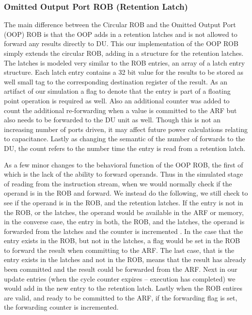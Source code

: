 \subsubsection{Omitted Output Port ROB (Retention Latch)}
The main difference between the Circular ROB and the Omitted Output Port (OOP) ROB is that the OOP adds in a retention latches and is not allowed to forward any results directly to DU.  This our implementation of the OOP ROB simply extends the circular ROB, adding in a structure for the retention latches.  The latches is modeled very similar to the ROB entries, an array
of a latch entry structure.  Each latch entry contains a 32 bit value for the results to be stored as well small tag to the corresponding destination register of the result.  As an artifact of our simulation a flag to denote that the entry is part of a floating point operation is required as well.  Also an additional counter was added to count the additional re-forwarding when a value is committed to the ARF but also needs to be forwarded to the DU unit as well.  Though this is not an increasing number of ports driven, it may affect future power calculations relating to capacitance.  Lastly as changing the semantic of the number of forwards to the DU, the count refers to the number time the entry is read from a retention latch.

As a few minor changes to the behavioral function of the OOP ROB, the first of which is the lack of the ability to forward operands.  Thus in the simulated stage of reading from the instruction stream, when we would normally check if the operand is in the ROB and forward.  We instead do the following, we still check to see if the operand is in the ROB, and the retention latches. If the entry is not in the ROB, or the latches, the operand would be available in the ARF or memory, in the converse case,  the entry in both, the ROB, and the latches, the operand is forwarded from the latches and the counter is incremented .  In the case that the entry exists in the ROB, but not in the latches, a flag would be set in the ROB to forward the result when committing to the ARF. The last case, that is the entry exists in the latches and not in the ROB, means that the result has already been committed and the result could be forwarded from the ARF.  Next in our update entries (when the cycle counter expires -- execution has completed) we would add in the new entry to the retention latch.  Lastly when the ROB entires are valid, and ready to be committed to the ARF,
if the forwarding flag is set, the forwarding counter is incremented.

